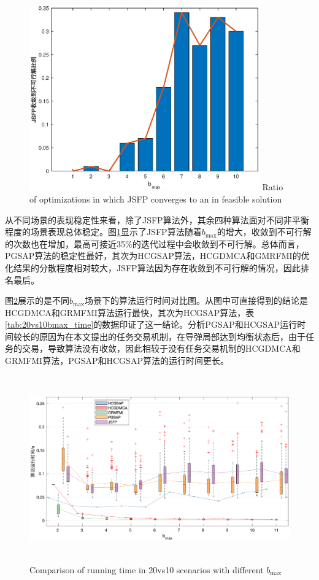 \begin{figure}[!htp]
  \centering
  \includegraphics[height=8cm]{hedonic_game/JSFP_zeros}
    {Ratio of optimizations in which JSFP converges to an in feasible solution}
  \label{fig:JSFP_zeros}
\end{figure}


从不同场景的表现稳定性来看，除了JSFP算法外，其余四种算法面对不同非平衡程度的场景表现总体稳定。图\ref{fig:JSFP_zeros}显示了JSFP算法随着$b_{\text{max}}$的增大，收敛到不可行解的次数也在增加，最高可接近35\%的迭代过程中会收敛到不可行解。总体而言，PGSAP算法的稳定性最好，其次为HCGSAP算法，HCGDMCA和GMRFMI的优化结果的分散程度相对较大，JSFP算法因为存在收敛到不可行解的情况，因此排名最后。

图\ref{fig:20vs10bmax_time}展示的是不同$b_{\text{max}}$场景下的算法运行时间对比图。从图中可直接得到的结论是HCGDMCA和GRMFMI算法运行最快，其次为HCGSAP算法，表\ref{tab:20vs10bmax_time}的数据印证了这一结论。分析PGSAP和HCGSAP运行时间较长的原因为在本文提出的任务交易机制，在导弹局部达到均衡状态后，由于任务的交易，导致算法没有收敛，因此相较于没有任务交易机制的HCGDMCA和GRMFMI算法，PGSAP和HCGSAP算法的运行时间更长。

\begin{figure}[!htp]
  \centering
  \includegraphics[height=8cm]{hedonic_game/BoxUnbalanceBmaxTimeV2}
    {Comparison of running time in 20vs10 scenarios with different $b_{\text{max}}$}
  \label{fig:20vs10bmax_time}
\end{figure}


